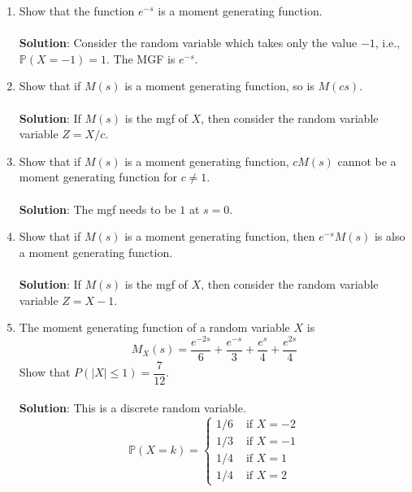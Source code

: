 \documentclass{article}
\newcommand{\abs}[1]{\displaystyle\left\lvert#1\right\rvert}
\newcommand{\Pb}{\mathbb{P}}
\newcommand{\bkt}[1]{\left(#1\right)}
\newcommand{\soln}[1]{\\ \textbf{Solution}:#1\\}
\begin{document}
\begin{enumerate}
	\soln{Use the MGF to conclude.}
	\item
	Show that the function $e^{-s}$ is a moment generating function.\\
	\soln{
	Consider the random variable which takes only the value $-1$, i.e., $\Pb\bkt{X=-1}=1$. The MGF is $e^{-s}$.
	}
	\item
	Show that if $M(s)$ is a moment generating function, so is $M(cs)$.\\
	\soln{
	If $M(s)$ is the mgf of $X$, then consider the random variable variable $Z = X/c$.
	}
	\item
	Show that if $M(s)$ is a moment generating function, $cM(s)$ cannot be a moment generating function for $c \neq 1$.\\
	\soln{
	The mgf needs to be $1$ at $s=0$.
	}
	\item
	Show that if $M(s)$ is a moment generating function, then $e^{-s}M(s)$ is also a moment generating function.\\
	\soln{
	If $M(s)$ is the mgf of $X$, then consider the random variable variable $Z = X-1$.
	}
	\item
	The moment generating function of a random variable $X$ is
	$$M_X(s) = \dfrac{e^{-2s}}6 + \dfrac{e^{-s}}3 + \dfrac{e^{s}}4 + \dfrac{e^{2s}}4$$
	Show that $P\bkt{\abs{X} \leq 1} = \dfrac7{12}$.\\
	\soln{
	This is a discrete random variable.
	$$\Pb\bkt{X=k}=\begin{cases}
	1/6 & \text{ if }X=-2\\
	1/3 & \text{ if }X=-1\\
	1/4 & \text{ if }X=1\\
	1/4 & \text{ if }X=2
	\end{cases}$$
	}
	\end{enumerate}
\end{document}
